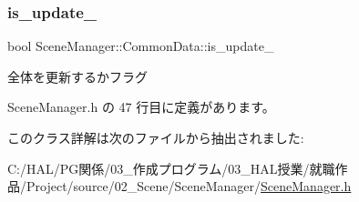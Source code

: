 \subsubsection{\texorpdfstring{is\+\_\+update\+\_\+}{is\_update\_}}
{\footnotesize\ttfamily bool Scene\+Manager\+::\+Common\+Data\+::is\+\_\+update\+\_\+\hspace{0.3cm}{\ttfamily [private]}}



全体を更新するかフラグ 



 Scene\+Manager.\+h の 47 行目に定義があります。



このクラス詳解は次のファイルから抽出されました\+:\begin{DoxyCompactItemize}
\item 
C\+:/\+H\+A\+L/\+P\+G関係/03\+\_\+作成プログラム/03\+\_\+\+H\+A\+L授業/就職作品/\+Project/source/02\+\_\+\+Scene/\+Scene\+Manager/\mbox{\hyperlink{_scene_manager_8h}{Scene\+Manager.\+h}}\end{DoxyCompactItemize}
